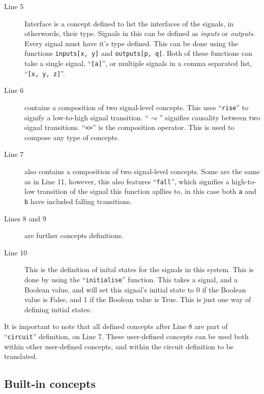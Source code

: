 \documentclass{proc}
\begin{document}
\begin{description}
  \item [Line 5] Interface is a concept defined to list the interfaces of the signals, in otherwords, their type. Signals in this can be defined as \emph{inputs} or \emph{outputs}. Every signal
  must have it's type defined. This can be done using the functions \texttt{inputs[x, y]} and \texttt{outputs[p, q]}. Both of these functions can take a single signal, ``\texttt{[a]}'', or 
  multiple signals in a comma separated list, ``\texttt{[x, y, z]}''.
  
  \item [Line 6] contains a composition of two signal-level concepts. This uses ``\texttt{rise}'' to signify a low-to-high signal transition. ``$\rightsquigarrow$'' signifies causality between two 
  signal transitions. ``\texttt{<>}'' is the composition operator. This is used to compose any type of concepts. 
  
  \item [Line 7] also contains a composition of two signal-level concepts. Some are the same as in Line 11, however, this also features ``\texttt{fall}'', which signifies a high-to-low transition 
  of the signal this function apllies to, in this case both \texttt{a} and \texttt{b} have included falling transitions.
  
  \item [Lines 8 and 9] are further concepts definitions.
  
  \item [Line 10] This is the definition of inital states for the signals in this system. This is done by using the ``\texttt{initialise}'' function. This takes a signal, and a Boolean value, and will set 
  this signal's initial state to 0 if the Boolean value is False, and 1 if the Boolean value is True. This is just one way of defining initial states. 

\end{description}

It is important to note that all defined concepts after Line 8 are part of ``\texttt{circuit}'' definition, on Line 7. These user-defined concepts can be used both within other user-defined 
concepts, and within the circuit definition to be translated. 

\subsection{Built-in concepts \label{sub:built-in_concepts}}
\end{document}
